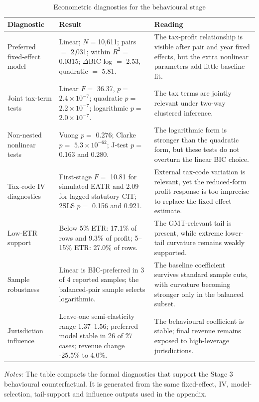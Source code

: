 \begin{table}[H]
\centering
\footnotesize
\setlength{\tabcolsep}{3pt}
\caption[Econometric diagnostics for the behavioural stage]{Econometric diagnostics for the behavioural stage}
\label{tab:stage3_econometric_scorecard}
\begin{tabular}{@{}L{3.2cm}L{5.4cm}L{6.2cm}@{}}
\toprule
Diagnostic & Result & Reading \\
\midrule
Preferred fixed-effect model & Linear; $N=$10,611; pairs $=$ 2,031; within $R^2=$ 0.0315; $\Delta$BIC log $=$ 2.53, quadratic $=$ 5.81. & The tax-profit relationship is visible after pair and year fixed effects, but the extra nonlinear parameters add little baseline fit. \\
Joint tax-term tests & Linear $F=$ 36.37, $p=$ $2.4 \times 10^{-7}$; quadratic $p=$ $2.2 \times 10^{-7}$; logarithmic $p=$ $2.0 \times 10^{-7}$. & The tax terms are jointly relevant under two-way clustered inference. \\
Non-nested nonlinear tests & Vuong $p=$ 0.276; Clarke $p=$ $5.3 \times 10^{-62}$; J-test $p=$ 0.163 and 0.280. & The logarithmic form is stronger than the quadratic form, but these tests do not overturn the linear BIC choice. \\
Tax-code IV diagnostics & First-stage $F=$ 10.81 for simulated EATR and 2.09 for lagged statutory CIT; 2SLS $p=$ 0.156 and 0.921. & External tax-code variation is relevant, yet the reduced-form profit response is too imprecise to replace the fixed-effect estimate. \\
Low-ETR support & Below 5\% ETR: 17.1\% of rows and 9.3\% of profit; 5--15\% ETR: 27.0\% of rows. & The GMT-relevant tail is present, while extreme lower-tail curvature remains weakly supported. \\
Sample robustness & Linear is BIC-preferred in 3 of 4 reported samples; the balanced-pair sample selects logarithmic. & The baseline coefficient survives standard sample cuts, with curvature becoming stronger only in the balanced subset. \\
Jurisdiction influence & Leave-one semi-elasticity range 1.37--1.56; preferred model stable in 26 of 27 cases; revenue change -25.5\% to 4.0\%. & The behavioural coefficient is stable; final revenue remains exposed to high-leverage jurisdictions. \\
\bottomrule
\end{tabular}

\vspace{0.35em}
\noindent\begin{minipage}{\textwidth}
\footnotesize\raggedright\textit{Notes:} The table compacts the formal diagnostics that support the Stage 3 behavioural counterfactual. It is generated from the same fixed-effect, IV, model-selection, tail-support and influence outputs used in the appendix.
\end{minipage}
\end{table}
